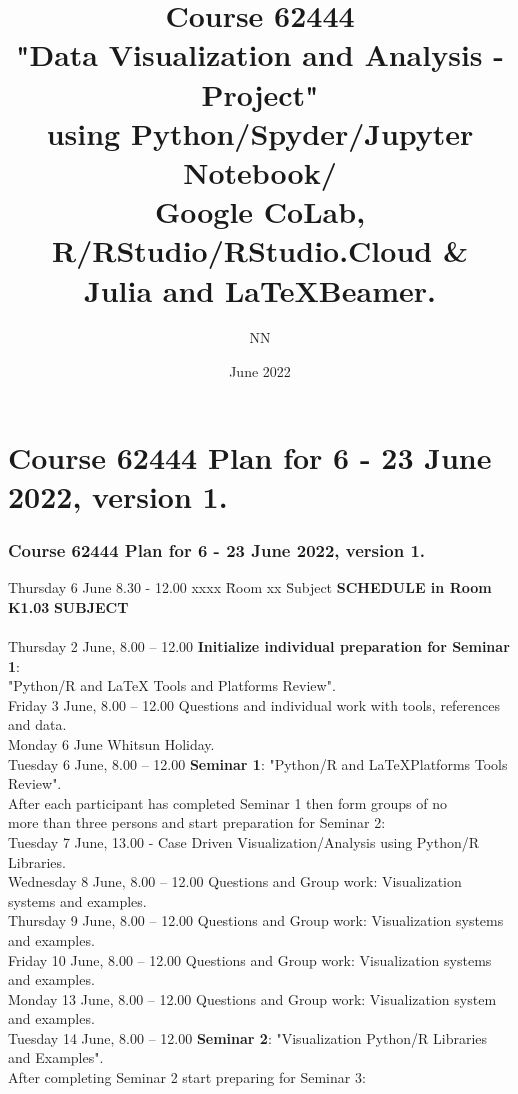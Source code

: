 \documentclass{beamer}
\title[Course 62444]{Course 62444\\"Data Visualization and Analysis - Project"\\
using Python/Spyder/Jupyter Notebook/\\ Google CoLab,\\ R/RStudio/RStudio.Cloud \&\\ 
Julia and \LaTeX Beamer.} %
\author{
NN}   %
\institute[DTU Diplom] %
{
DTU Engineering Technology\\ %
\medskip
\textit{xyz@dtu.dk} %
}
\date{June 2022} %
\begin{document}
\begin{frame}
\titlepage %
\end{frame}



%
%
\section{Course 62444 Plan for 6 - 23 June 2022, version 1.}
\begin{frame}[fragile]
\frametitle{Course 62444 Plan for 6 - 23 June 2022, version 1. }
\tiny{

\begin{tabbing}
  Thursday 6 June 8.30 - 12.00 xxxx \= Room xx  \= Subject \kill
  {\bf SCHEDULE in Room K1.03}            \>  {\bf SUBJECT} \\ \\
  Thursday 2 June, 8.00 -- 12.00 \>  {\bf Initialize individual preparation for Seminar 1}:\\
                                 \>   "Python/R and \LaTeX \hspace*{0.5mm} Tools and Platforms Review".\\
  Friday 3 June, 8.00 -- 12.00 \> Questions and  individual work with tools, references and data. \\
  Monday 6 June          \> Whitsun Holiday.\\
 Tuesday 6  June, 8.00 -- 12.00 \>  {\bf Seminar 1}: "Python/R and \LaTeX Platforms \hspace*{0.3mm} Tools Review".\\
                                 \>  After each participant has completed Seminar 1 then form groups of no\\
                                 \>   more than three persons and start preparation for Seminar 2:\\
  Tuesday 7 June, 13.00 -  \> Case Driven Visualization/Analysis using  Python/R Libraries.\\
  Wednesday 8 June, 8.00 -- 12.00 \> Questions and Group work: Visualization systems and examples.\\
  Thursday 9 June, 8.00 -- 12.00   \> Questions and Group work: Visualization systems and examples.\\
  Friday 10 June, 8.00 -- 12.00    \> Questions and Group work: Visualization systems and examples.\\
  Monday 13 June, 8.00 -- 12.00   \> Questions and Group work: Visualization system and examples.\\
  Tuesday 14 June, 8.00 -- 12.00 \> {\bf Seminar 2}: "Visualization Python/R Libraries and Examples".\\
                                 \>   After completing Seminar 2 start preparing for Seminar 3:\\
                                 

\end{tabbing}}
\end{frame}
\end{document}

